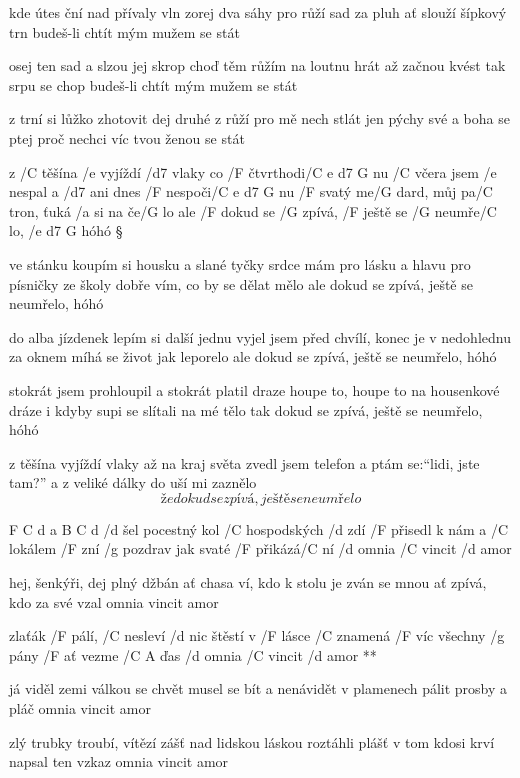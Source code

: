 kde útes ční nad přívaly vln
zorej dva sáhy pro růží sad
za pluh ať slouží šípkový trn
budeš-li chtít mým mužem se stát \s

osej ten sad a slzou jej skrop
choď těm růžím na loutnu hrát
až začnou kvést tak srpu se chop
budeš-li chtít mým mužem se stát \s

z trní si lůžko zhotovit dej
druhé z růží pro mě nech stlát
jen pýchy své a boha se ptej
proč nechci víc tvou ženou se stát




z /C těšína /e vyjíždí /d7 vlaky co /F čtvrthodi/{C e d7 G} nu
/C včera jsem /e nespal a /d7 ani dnes /F nespoči/{C e d7 G} nu
/F svatý me/G dard, můj pa/C tron, ťuká /a si na če/G lo
ale /F dokud se /G zpívá, /F ještě se /G neumře/C lo, /{e d7 G} hóhó \S

ve stánku koupím si housku a slané tyčky
srdce mám pro lásku a hlavu pro písničky
ze školy dobře vím, co by se dělat mělo
ale dokud se zpívá, ještě se neumřelo, hóhó \s

do alba jízdenek lepím si další jednu
vyjel jsem před chvílí, konec je v nedohlednu
za oknem míhá se život jak leporelo
ale dokud se zpívá, ještě se neumřelo, hóhó \s

stokrát jsem prohloupil a stokrát platil draze
houpe to, houpe to na housenkové dráze
i kdyby supi se slítali na mé tělo
tak dokud se zpívá, ještě se neumřelo, hóhó \s

z těšína vyjíždí vlaky až na kraj světa
zvedl jsem telefon a ptám se:``lidi, jste tam?''
a z veliké dálky do uší mi zaznělo
\[ že dokud se zpívá, ještě se neumřelo \]




F C d a B C d
/d šel pocestný kol /C hospodských /d zdí
/F přisedl k nám a /C lokálem /F zní
/g pozdrav jak svaté /F přikázá/C ní
/d omnia /C vincit /d amor \s

hej, šenkýři, dej plný džbán
ať chasa ví, kdo k stolu je zván
se mnou ať zpívá, kdo za své vzal
omnia vincit amor \s

\R zlaťák /F pálí, /C nesleví /d nic
   štěstí v /F lásce /C znamená /F víc
   všechny /g pány /F ať vezme /{C A} ďas
   /d omnia /C vincit /d amor **

já viděl zemi válkou se chvět
musel se bít a nenávidět
v plamenech pálit prosby a pláč
omnia vincit amor \s

zlý trubky troubí, vítězí zášť
nad lidskou láskou roztáhli plášť
v tom kdosi krví napsal ten vzkaz
omnia vincit amor \s

